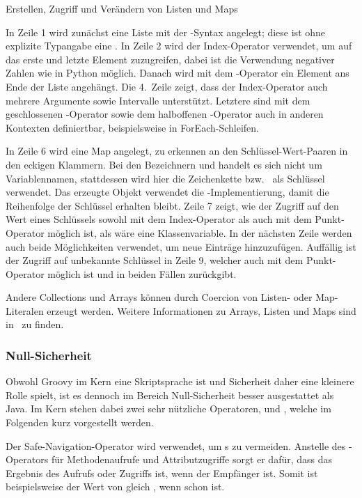 \documentclass[a4paper]{article}
\newcommand{\codelisting}[3]{\begin{listing}[htp]
	\inputminted{#1}{#1/#2}
	\vspace{-3ex}
	\caption{#3}
	\label{lst:#2}
\end{listing}}
\begin{document}
\codelisting{groovy}{lists-and-maps.groovy}{Erstellen, Zugriff und Verändern von Listen und Maps}

In Zeile 1 wird zunächst eine Liste mit der \code{[]}-Syntax angelegt;
diese ist ohne explizite Typangabe eine .
In Zeile 2 wird der Index-Operator verwendet, um auf das erste und letzte Element zuzugreifen, dabei ist die Verwendung negativer Zahlen wie in Python möglich.
Danach wird mit dem \code{<<}-Operator ein Element ans Ende der Liste angehängt.
Die 4.~Zeile zeigt, dass der Index-Operator auch mehrere Argumente sowie Intervalle unterstützt.
Letztere sind mit dem geschlossenen -Operator sowie dem halboffenen -Operator auch in anderen Kontexten definiertbar, beispielsweise in ForEach-Schleifen.

In Zeile 6 wird eine Map angelegt, zu erkennen an den Schlüssel-Wert-Paaren in den eckigen Klammern.
Bei den Bezeichnern  und  handelt es sich nicht um Variablennamen, stattdessen wird hier die Zeichenkette  bzw.~ als Schlüssel verwendet.
Das erzeugte Objekt verwendet die -Implementierung, damit die Reihenfolge der Schlüssel erhalten bleibt.
Zeile 7 zeigt, wie der Zugriff auf den Wert eines Schlüssels sowohl mit dem Index-Operator als auch mit dem Punkt-Operator möglich ist, als wäre  eine Klassenvariable.
In der nächsten Zeile werden auch beide Möglichkeiten verwendet, um neue Einträge hinzuzufügen.
Auffällig ist der Zugriff auf unbekannte Schlüssel in Zeile 9, welcher auch mit dem Punkt-Operator möglich ist und in beiden Fällen  zurückgibt.

Andere Collections und Arrays können durch Coercion von Listen- oder Map-Literalen erzeugt werden.
Weitere Informationen zu Arrays, Listen und Maps sind in~\cite[Abs.~1.1.7.-1.1.9.]{groovy-lang:documentation} zu finden.

\subsubsection{Null-Sicherheit}

Obwohl Groovy im Kern eine Skriptsprache ist und Sicherheit daher eine kleinere Rolle spielt, ist es dennoch im Bereich Null-Sicherheit besser ausgestattet als Java.
Im Kern stehen dabei zwei sehr nützliche Operatoren,  und , welche im Folgenden kurz vorgestellt werden.

Der Safe-Navigation-Operator  wird verwendet, um s zu vermeiden.
Anstelle des -Operators für Methodenaufrufe und Attributzugriffe sorgt er dafür, dass das Ergebnis des Aufrufs oder Zugriffs  ist, wenn der Empfänger  ist.
Somit ist beispielsweise der Wert von  gleich , wenn  schon  ist.
\end{document}
